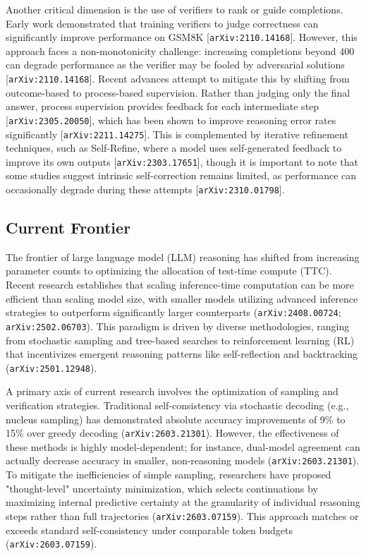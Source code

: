 \documentclass[11pt]{article}
\begin{document}
Another critical dimension is the use of verifiers to rank or guide completions. Early work demonstrated that training verifiers to judge correctness can significantly improve performance on GSM8K [\texttt{arXiv:2110.14168}]. However, this approach faces a non-monotonicity challenge: increasing completions beyond 400 can degrade performance as the verifier may be fooled by adversarial solutions [\texttt{arXiv:2110.14168}]. Recent advances attempt to mitigate this by shifting from outcome-based to process-based supervision. Rather than judging only the final answer, process supervision provides feedback for each intermediate step [\texttt{arXiv:2305.20050}], which has been shown to improve reasoning error rates significantly [\texttt{arXiv:2211.14275}]. This is complemented by iterative refinement techniques, such as Self-Refine, where a model uses self-generated feedback to improve its own outputs [\texttt{arXiv:2303.17651}], though it is important to note that some studies suggest intrinsic self-correction remains limited, as performance can occasionally degrade during these attempts [\texttt{arXiv:2310.01798}].

\subsection{Current Frontier}

The frontier of large language model (LLM) reasoning has shifted from increasing parameter counts to optimizing the allocation of test-time compute (TTC). Recent research establishes that scaling inference-time computation can be more efficient than scaling model size, with smaller models utilizing advanced inference strategies to outperform significantly larger counterparts (\texttt{arXiv:2408.00724}; \texttt{arXiv:2502.06703}). This paradigm is driven by diverse methodologies, ranging from stochastic sampling and tree-based searches to reinforcement learning (RL) that incentivizes emergent reasoning patterns like self-reflection and backtracking (\texttt{arXiv:2501.12948}).

A primary axis of current research involves the optimization of sampling and verification strategies. Traditional self-consistency via stochastic decoding (e.g., nucleus sampling) has demonstrated absolute accuracy improvements of 9\% to 15\% over greedy decoding (\texttt{arXiv:2603.21301}). However, the effectiveness of these methods is highly model-dependent; for instance, dual-model agreement can actually decrease accuracy in smaller, non-reasoning models (\texttt{arXiv:2603.21301}). To mitigate the inefficiencies of simple sampling, researchers have proposed "thought-level" uncertainty minimization, which selects continuations by maximizing internal predictive certainty at the granularity of individual reasoning steps rather than full trajectories (\texttt{arXiv:2603.07159}). This approach matches or exceeds standard self-consistency under comparable token budgets (\texttt{arXiv:2603.07159}).
\end{document}
